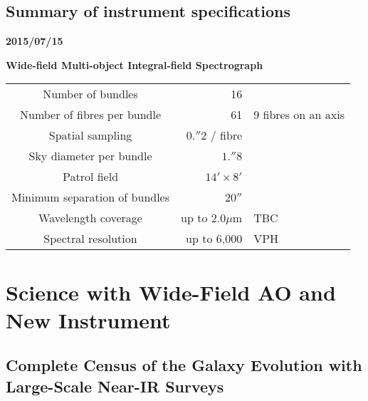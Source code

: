 \bigskip


\bigskip

\subsection{Summary of instrument specifications}

\par\noindent
{\bf 2015/07/15}

\par\noindent
{\bf Wide-field Multi-object Integral-field Spectrograph}

\begin{table}[!ht]
\begin{center}
\begin{tabular}{crl}
Number of bundles &  16 & \\
Number of fibres per bundle & 61 & 9 fibres on an axis\\
Spatial sampling & $0.''2$ / fibre \\
Sky diameter per bundle & $1.''8$\\
Patrol field & $14' \times 8'$\\
Minimum separation of bundles & $20''$\\
Wavelength coverage & up to 2.0$\mu$m & TBC\\
Spectral resolution & up to 6,000 & VPH \\
\end{tabular}
\end{center}

\end{table}

\section{Science with Wide-Field AO and New Instrument}

\subsection{Complete Census of the Galaxy Evolution with Large-Scale
  Near-IR Surveys}

